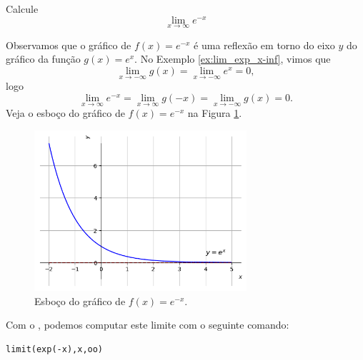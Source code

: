 \cleardoublepage\documentclass[../main.tex]{subfiles}
\begin{document}
\begin{exeresol}
  Calcule
  \begin{equation*}
    \lim_{x\to \infty} e^{-x}
  \end{equation*}
\end{exeresol}
\begin{resol}
  Observamos que o gráfico de $f(x)=e^{-x}$ é uma reflexão em torno do eixo $y$ do gráfico da função $g(x)=e^x$. No Exemplo \ref{ex:lim_exp_x-inf}, vimos que
  \begin{equation*}
    \lim_{x\to -\infty} g(x) = \lim_{x\to -\infty} e^{x} = 0,
  \end{equation*}
  logo
  \begin{equation*}
    \lim_{x\to \infty} e^{-x} = \lim_{x\to \infty} g(-x) = \lim_{x\to -\infty} g(x) = 0.
  \end{equation*}
  Veja o esboço do gráfico de $f(x)=e^{-x}$ na Figura \ref{fig:exeresol_lim_exp_xinf}.

  \begin{figure}[htb]
    \centering
    \includegraphics[width=0.7\textwidth]{fig_lim/fig_exeresol_lim_exp_xinf}
    \caption{Esboço do gráfico de $f(x)=e^{-x}$.}
    \label{fig:exeresol_lim_exp_xinf}
  \end{figure}  

  
  Com o \geogebra, podemos computar este limite com o seguinte comando:
\begin{verbatim}
limit(exp(-x),x,oo)
\end{verbatim}
 
\end{resol}
\end{document}
